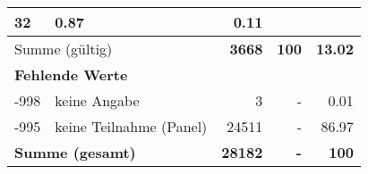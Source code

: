 \begin{longtable}{lXrrr}
       \num{32} &
       \num[round-mode=places,round-precision=2]{0,87} &
         \num[round-mode=places,round-precision=2]{0,11} \\
     \midrule
     \multicolumn{2}{l}{Summe (gültig)} &
       \textbf{\num{3668}} &
     \textbf{100} &
       \textbf{\num[round-mode=places,round-precision=2]{13,02}} \\
     \multicolumn{5}{l}{\textbf{Fehlende Werte}}\\
       -998 &
       keine Angabe &
         \num{3} &
        - &
         \num[round-mode=places,round-precision=2]{0,01} \\
       -995 &
       keine Teilnahme (Panel) &
         \num{24511} &
        - &
         \num[round-mode=places,round-precision=2]{86,97} \\
     \midrule
     \multicolumn{2}{l}{\textbf{Summe (gesamt)}} &
          \textbf{\num{28182}} &
        \textbf{-} &
        \textbf{100} \\
     \bottomrule
     \end{longtable}
     
